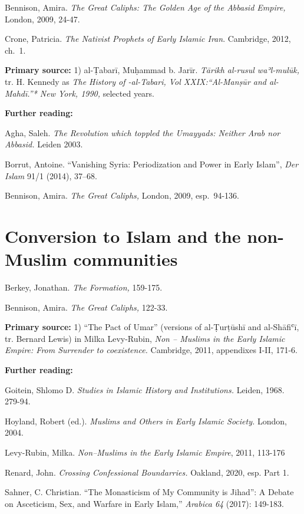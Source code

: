 \documentclass[
]{book}
\begin{document}
Bennison, Amira. \emph{The Great Caliphs: The Golden Age of the Abbasid Empire,} London, 2009, 24-47.

Crone, Patricia. \emph{The Nativist Prophets of Early Islamic Iran}. Cambridge, 2012, ch.~1.

\textbf{Primary source:} 1) al-Ṭabarī, Muḥammad b. Jarīr. \emph{Tārikh al-rusul waʾl-mulūk,} tr. H. Kennedy as \emph{The History of -al-Tabari, Vol XXIX:``Al-Manṣūr and al-Mahdī.''* New York, 1990,} selected years.

\textbf{Further reading:}

Agha, Saleh. \emph{The Revolution which toppled the Umayyads: Neither Arab nor Abbasid.} Leiden 2003.

Borrut, Antoine. ``Vanishing Syria: Periodization and Power in Early Islam'', \emph{Der Islam} 91/1 (2014), 37--68.

Bennison, Amira. \emph{The Great Caliphs,} London, 2009, esp.~94-136.

\hypertarget{conversion-to-islam-and-the-non-muslim-communities}{%
\chapter{Conversion to Islam and the non-Muslim communities}\label{conversion-to-islam-and-the-non-muslim-communities}}

Berkey, Jonathan. \emph{The Formation,} 159-175.

Bennison, Amira. \emph{The Great Caliphs,} 122-33.

\textbf{Primary source:} 1) ``The Pact of Umar'' (versions of al-Ṭurṭūshī and
al-Shāfiʿī, tr. Bernard Lewis) in Milka Levy-Rubin, \emph{Non -- Muslims in
the Early Islamic Empire: From Surrender to coexistence.} Cambridge,
2011, appendixes I-II, 171-6.

\textbf{Further reading:}

Goitein, Shlomo D. \emph{Studies in Islamic History and Institutions.}
Leiden, 1968. 279-94.

Hoyland, Robert (ed.). \emph{Muslims and Others in Early Islamic Society.}
London, 2004.

Levy-Rubin, Milka. \emph{Non--Muslims in the Early Islamic Empire}, 2011,
113-176

Renard, John. \emph{Crossing Confessional Boundarries.} Oakland, 2020, esp.
Part 1.

Sahner, C. Christian. ``The Monasticism of My Community is Jihad'': A
Debate on Asceticism, Sex, and Warfare in Early Islam,'' \emph{Arabica 64}
(2017): 149-183.
\end{document}
